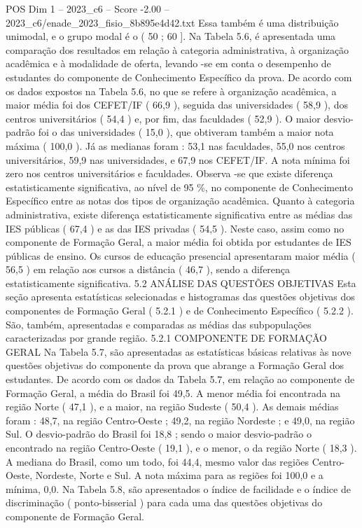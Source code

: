 \begin{textsample}{POS Dim 1 – 2023\_c6 – Score -2.00 – 2023\_c6/enade\_2023\_fisio\_8b895e4d42.txt}
Essa também é uma distribuição unimodal, e o grupo modal é o ( 50 ; 60 ].
Na Tabela 5.6, é apresentada uma comparação dos resultados em relação à categoria administrativa, à organização acadêmica e à modalidade de oferta, levando -se em conta o desempenho de estudantes do componente de Conhecimento Específico da prova.
De acordo com os dados expostos na Tabela 5.6, no que se refere à organização acadêmica, a maior média foi dos CEFET/IF ( 66,9 ), seguida das universidades ( 58,9 ), dos centros universitários ( 54,4 ) e, por fim, das faculdades ( 52,9 ).
O maior desvio-padrão foi o das universidades ( 15,0 ), que obtiveram também a maior nota máxima ( 100,0 ).
Já as medianas foram : 53,1 nas faculdades, 55,0 nos centros universitários, 59,9 nas universidades, e 67,9 nos CEFET/IF.
A nota mínima foi zero nos centros universitários e faculdades.
Observa -se que existe diferença estatisticamente significativa, ao nível de 95 \%, no componente de Conhecimento Específico entre as notas dos tipos de organização acadêmica.
Quanto à categoria administrativa, existe diferença estatisticamente significativa entre as médias das IES públicas ( 67,4 ) e as das IES privadas ( 54,5 ).
Neste caso, assim como no componente de Formação Geral, a maior média foi obtida por estudantes de IES públicas de ensino.
Os cursos de educação presencial apresentaram maior média ( 56,5 ) em relação aos cursos a distância ( 46,7 ), sendo a diferença estatisticamente significativa. 5.2 ANÁLISE DAS QUESTÕES OBJETIVAS Esta seção apresenta estatísticas selecionadas e histogramas das questões objetivas dos componentes de Formação Geral ( 5.2.1 ) e de Conhecimento Específico ( 5.2.2 ).
São, também, apresentadas e comparadas as médias das subpopulações caracterizadas por grande região. 5.2.1 COMPONENTE DE FORMAÇÃO GERAL Na Tabela 5.7, são apresentadas as estatísticas básicas relativas às nove questões objetivas do componente da prova que abrange a Formação Geral dos estudantes.
De acordo com os dados da Tabela 5.7, em relação ao componente de Formação Geral, a média do Brasil foi 49,5.
A menor média foi encontrada na região Norte ( 47,1 ), e a maior, na região Sudeste ( 50,4 ).
As demais médias foram : 48,7, na região Centro-Oeste ; 49,2, na região Nordeste ; e 49,0, na região Sul.
O desvio-padrão do Brasil foi 18,8 ; sendo o maior desvio-padrão o encontrado na região Centro-Oeste ( 19,1 ), e o menor, o da região Norte ( 18,3 ).
A mediana do Brasil, como um todo, foi 44,4, mesmo valor das regiões Centro-Oeste, Nordeste, Norte e Sul.
A nota máxima para as regiões foi 100,0 e a mínima, 0,0.
Na Tabela 5.8, são apresentados o índice de facilidade e o índice de discriminação ( ponto-bisserial ) para cada uma das questões objetivas do componente de Formação Geral.

\end{textsample}
